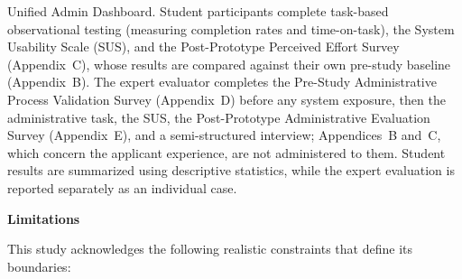 \begin{itemize}
Unified Admin Dashboard. Student participants complete task-based
observational testing (measuring completion rates and time-on-task), the
System Usability Scale (SUS), and the Post-Prototype Perceived Effort
Survey (Appendix~C), whose results are compared against their own
pre-study baseline (Appendix~B). The expert evaluator completes the
Pre-Study Administrative Process Validation Survey (Appendix~D) before
any system exposure, then the administrative task, the SUS, the
Post-Prototype Administrative Evaluation Survey (Appendix~E), and a
semi-structured interview; Appendices~B and~C, which concern the
applicant experience, are not administered to them. Student results are
summarized using
descriptive statistics, while the expert evaluation is reported
separately as an individual case.
\end{itemize}

\textbf{Limitations}

This study acknowledges the following realistic constraints that define its boundaries:

